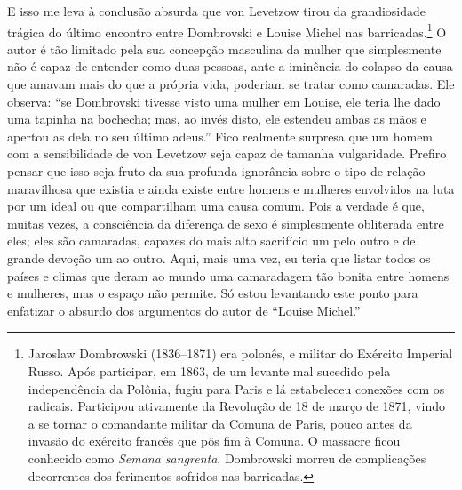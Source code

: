 E isso me leva à conclusão absurda que von Levetzow tirou da
grandiosidade trágica do último encontro entre Dombrovski e
Louise Michel nas barricadas.\footnote{Jaroslaw Dombrowski (1836--1871)
  era polonês, e militar do Exército Imperial Russo. Após participar, em
  1863, de um levante mal sucedido pela independência da Polônia, fugiu
  para Paris e lá estabeleceu conexões com os radicais. Participou
  ativamente da Revolução de 18 de março de 1871, vindo a se tornar o
  comandante militar da Comuna de Paris, pouco antes da invasão do
  exército francês que pôs fim à Comuna. O massacre ficou conhecido como
  \textit{Semana sangrenta}. Dombrowski morreu de complicações decorrentes
  dos ferimentos sofridos nas barricadas.} O autor é tão limitado pela
sua concepção masculina da mulher que simplesmente não é capaz de
entender como duas pessoas, ante a iminência do colapso da causa que
amavam mais do que a própria vida, poderiam se tratar como camaradas.
Ele observa: ``se Dombrovski tivesse visto uma mulher em Louise, ele
teria lhe dado uma tapinha na bochecha; mas, ao invés disto, ele
estendeu ambas as mãos e apertou as dela no seu último adeus.'' Fico
realmente surpresa que um homem com a sensibilidade de von Levetzow seja
capaz de tamanha vulgaridade. Prefiro pensar que isso seja fruto da sua profunda
ignorância sobre o tipo de relação maravilhosa que existia e ainda
existe entre homens e mulheres envolvidos na luta por um ideal ou que
compartilham uma causa comum. Pois a verdade é que, muitas vezes, a
consciência da diferença de sexo é simplesmente obliterada entre eles;
eles são camaradas, capazes do mais alto sacrifício um pelo outro e de
grande devoção um ao outro. Aqui, mais uma vez, eu teria que listar
todos os países e climas que deram ao mundo uma camaradagem tão bonita
entre homens e mulheres, mas o espaço não permite. Só estou levantando
este ponto para enfatizar o absurdo dos argumentos do autor de ``Louise
Michel.''

